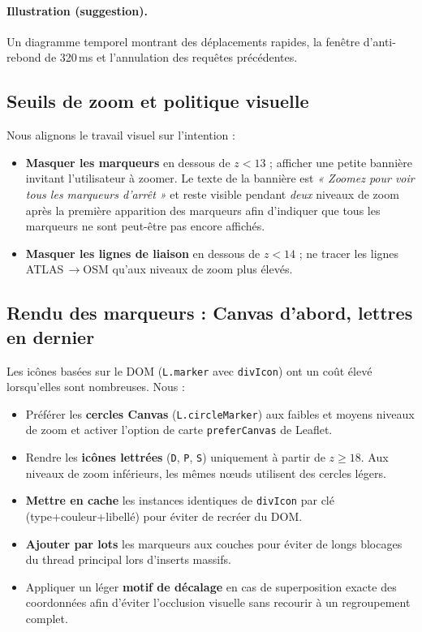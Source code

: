 \paragraph{Illustration (suggestion).} Un diagramme temporel montrant des déplacements rapides, la fenêtre d’anti-rebond de 320\,ms et l’annulation des requêtes précédentes.

\subsection{Seuils de zoom et politique visuelle}
Nous alignons le travail visuel sur l’intention :
\begin{itemize}
\item \textbf{Masquer les marqueurs} en dessous de \(z<13\) ; afficher une petite bannière invitant l’utilisateur à zoomer. Le texte de la bannière est \emph{« Zoomez pour voir tous les marqueurs d’arrêt »} et reste visible pendant \emph{deux} niveaux de zoom après la première apparition des marqueurs afin d’indiquer que tous les marqueurs ne sont peut-être pas encore affichés.
  \item \textbf{Masquer les lignes de liaison} en dessous de \(z<14\) ; ne tracer les lignes ATLAS\,\(\rightarrow\)OSM qu’aux niveaux de zoom plus élevés.
\end{itemize}

\subsection{Rendu des marqueurs : Canvas d’abord, lettres en dernier}
Les icônes basées sur le DOM (\verb|L.marker| avec \verb|divIcon|) ont un coût élevé lorsqu’elles sont nombreuses. Nous :
\begin{itemize}
  \item Préférer les \textbf{cercles Canvas} (\verb|L.circleMarker|) aux faibles et moyens niveaux de zoom et activer l’option de carte \verb|preferCanvas| de Leaflet.
  \item Rendre les \textbf{icônes lettrées} (\texttt{D}, \texttt{P}, \texttt{S}) uniquement à partir de \(z\geq18\). Aux niveaux de zoom inférieurs, les mêmes nœuds utilisent des cercles légers.
  \item \textbf{Mettre en cache} les instances identiques de \verb|divIcon| par clé (type+couleur+libellé) pour éviter de recréer du DOM.
  \item \textbf{Ajouter par lots} les marqueurs aux couches pour éviter de longs blocages du thread principal lors d’inserts massifs.
  \item Appliquer un léger \textbf{motif de décalage} en cas de superposition exacte des coordonnées afin d’éviter l’occlusion visuelle sans recourir à un 
  regroupement complet.
\end{itemize}

